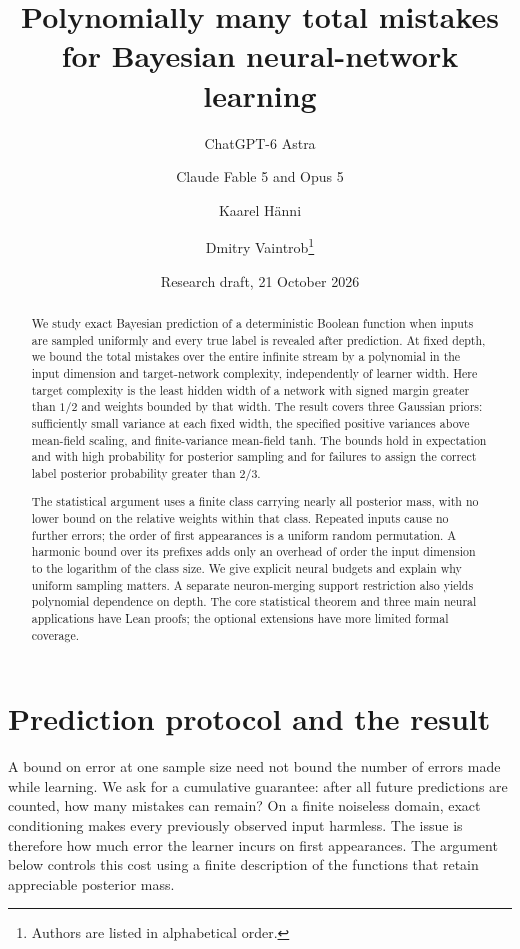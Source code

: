 \documentclass[11pt]{article}
\title{Polynomially many total mistakes\\for Bayesian neural-network learning}
\author{ChatGPT-6 Astra \and Claude Fable 5 and Opus 5 \and Kaarel H\"anni \and Dmitry Vaintrob\thanks{Authors are listed in alphabetical order.}}
\date{Research draft, 21 October 2026}
\theoremstyle{remark}\newtheorem{remark}[theorem]{Remark}
\begin{document}
\maketitle
\begin{abstract}
We study exact Bayesian prediction of a deterministic Boolean function
when inputs are sampled uniformly and every true label is revealed after
prediction. At fixed depth, we bound the total mistakes over the entire
infinite stream by a polynomial in the input dimension and target-network
complexity, independently of learner width. Here target complexity is the
least hidden width of a network with signed margin greater than $1/2$ and
weights bounded by that width. The result covers three Gaussian priors:
sufficiently small variance at each fixed width, the specified positive
variances above mean-field scaling, and finite-variance mean-field tanh.
The bounds hold in expectation and with high probability for posterior
sampling and for failures to assign the correct label posterior
probability greater than $2/3$.

The statistical argument uses a finite class carrying nearly all posterior
mass, with no lower bound on the relative weights within that class.
Repeated inputs cause no further errors; the order of first appearances
is a uniform random permutation. A harmonic bound over its prefixes adds
only an overhead of order the input dimension to the logarithm of the
class size. We give explicit neural budgets and explain why uniform
sampling matters. A separate neuron-merging support restriction also
yields polynomial dependence on depth. The core statistical theorem and
three main neural applications have Lean proofs; the optional extensions
have more limited formal coverage.
\end{abstract}

\section{Prediction protocol and the result}

A bound on error at one sample size need not bound the number of errors
made while learning. We ask for a cumulative guarantee: after all future
predictions are counted, how many mistakes can remain? On a finite
noiseless domain, exact conditioning makes every previously observed
input harmless. The issue is therefore how much error the learner incurs
on first appearances. The argument below controls this cost using a
finite description of the functions that retain appreciable posterior
mass.
\end{document}
